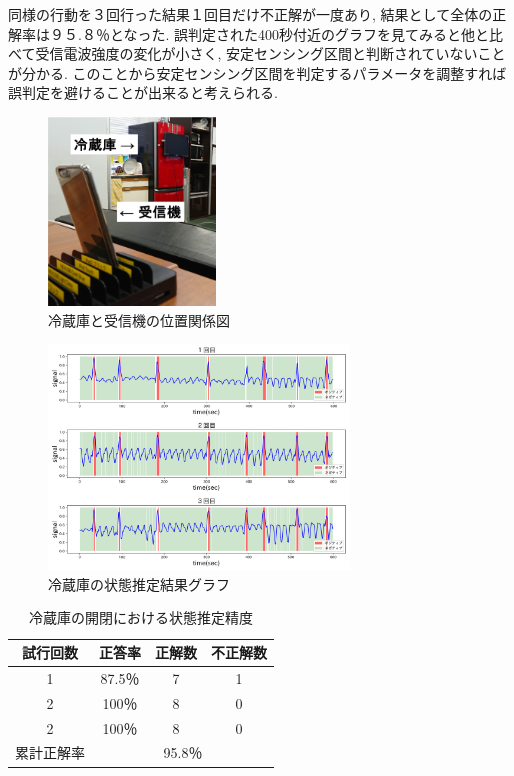 \documentclass[Japanese]{dicomopapers}
\begin{document}
同様の行動を３回行った結果１回目だけ不正解が一度あり, 結果として全体の正解率は９５.８％となった.
誤判定された400秒付近のグラフを見てみると他と比べて受信電波強度の変化が小さく, 安定センシング区間と判断されていないことが分かる.
このことから安定センシング区間を判定するパラメータを調整すれば誤判定を避けることが出来ると考えられる.

\begin{figure}[ht]
    \centering
    \includegraphics[height=5cm]{refrigerator_position.png}
    \caption{冷蔵庫と受信機の位置関係図}
    \label{refrigerator_position}
\end{figure}

\begin{figure}[ht]
    \centering
    \includegraphics[width=8cm]{refrigerator_graph.png}
    \caption{冷蔵庫の状態推定結果グラフ}
    \label{refrigerator_graph}
\end{figure}



\begin{table}[htb]
    \begin{center}
        \caption{冷蔵庫の開閉における状態推定精度}
        \label{refrigerator_fig}
        \begin{tabular}{|c|c|c|c|} \hline
        試行回数 & 正答率 & 正解数 & 不正解数 \\ \hline
        1 & 87.5％ & 7 & 1 \\ \hline
        2 & 100％ & 8 & 0 \\ \hline
        2 & 100％ & 8 & 0 \\ \hline \hline
        累計正解率 & \multicolumn{3}{c|}{95.8％} \\ \hline
        \end{tabular}
    \end{center}
\end{table}
\end{document}
